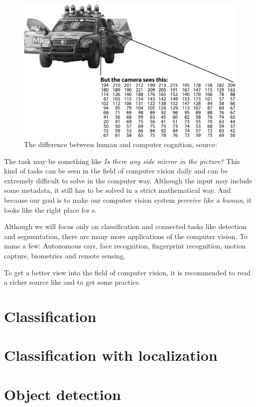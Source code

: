 \begin{figure}[H]
   \centering
	\includegraphics[width=.8\linewidth]{./pictures/comp-vision.png}
	\caption[Human and computer cognition]{The difference between human and computer cognition, source: \cite{opencv}}
      \label{fig:mirror}
\end{figure}

The task may be something like \textit{Is there any side mirror in the picture?} This kind of tasks can be seen in the field of computer vision daily and can be extremely difficult to solve in the computer way. Although the input may include some metadata, it still has to be solved in a strict mathematical way. And because our goal is to make our computer vision system \textit{perceive like a human}, it looks like the right place for s.

Although we will focus only on classification and connected tasks like detection and segmentation, there are many more applications of the computer vision. To name a few: Autonomous cars, face recognition, fingerprint recognition, motion capture, biometrics and remote sensing.

To get a better view into the field of computer vision, it is recommended to read a richer source like \cite{comp-vision} and \cite{opencv} to get some practice.

\section{Classification}
\label{classification}

\section{Classification with localization}
\label{classification-localization}

\section{Object detection}
\label{object-detection}

